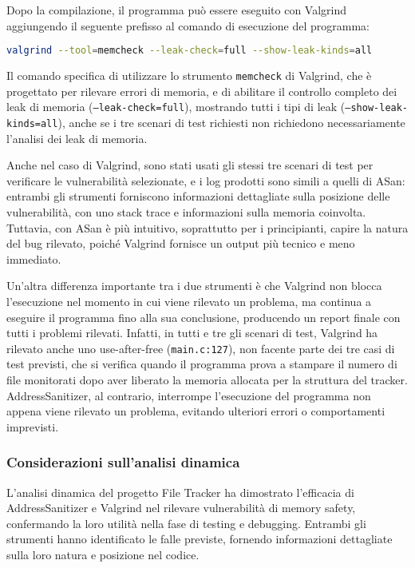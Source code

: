 Dopo la compilazione, il programma può essere eseguito con Valgrind aggiungendo il
seguente prefisso al comando di esecuzione del programma:
\begin{lstlisting}[language=bash, numbers=none]
valgrind --tool=memcheck --leak-check=full --show-leak-kinds=all
\end{lstlisting}

Il comando specifica di utilizzare lo strumento \texttt{memcheck} di Valgrind, che
è progettato per rilevare errori di memoria, e di abilitare il controllo
completo dei leak di memoria (\texttt{--leak-check=full}), mostrando tutti i
tipi di leak (\texttt{--show-leak-kinds=all}), anche se i tre scenari di test
richiesti non richiedono necessariamente l'analisi dei leak di memoria.

Anche nel caso di Valgrind, sono stati usati gli stessi tre scenari di test per verificare
le vulnerabilità selezionate, e i log prodotti sono simili a quelli di ASan: entrambi
gli strumenti forniscono informazioni dettagliate sulla posizione delle vulnerabilità,
con uno stack trace e informazioni sulla memoria coinvolta. Tuttavia, con ASan è
più intuitivo, soprattutto per i principianti, capire la natura del bug rilevato,
poiché Valgrind fornisce un output più tecnico e meno immediato.

Un'altra differenza importante tra i due strumenti è che Valgrind non blocca l'esecuzione
nel momento in cui viene rilevato un problema, ma continua a eseguire il
programma fino alla sua conclusione, producendo un report finale con tutti i problemi
rilevati. Infatti, in tutti e tre gli scenari di test, Valgrind ha rilevato
anche uno use-after-free (\texttt{main.c:127}), non facente parte dei tre casi
di test previsti, che si verifica quando il programma prova a stampare il numero
di file monitorati dopo aver liberato la memoria allocata per la struttura del tracker.
AddressSanitizer, al contrario, interrompe l'esecuzione del programma non appena
viene rilevato un problema, evitando ulteriori errori o comportamenti imprevisti.

\subsubsection*{Considerazioni sull'analisi dinamica}
L'analisi dinamica del progetto File Tracker ha dimostrato l'efficacia di AddressSanitizer
e Valgrind nel rilevare vulnerabilità di memory safety, confermando la loro
utilità nella fase di testing e debugging. Entrambi gli strumenti hanno identificato
le falle previste, fornendo informazioni dettagliate sulla loro natura e
posizione nel codice.

